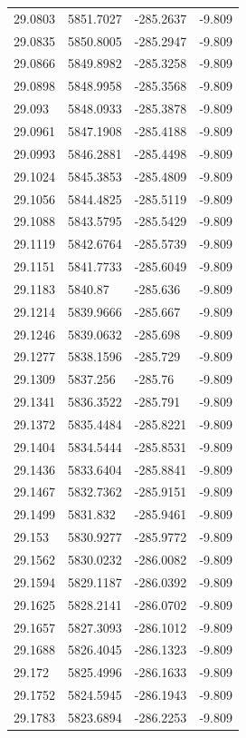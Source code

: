 \begin{table}[H]
\begin{tabular}{llll}
29.0803 & 5851.7027 & -285.2637 & -9.809 \\
29.0835 & 5850.8005 & -285.2947 & -9.809 \\
29.0866 & 5849.8982 & -285.3258 & -9.809 \\
29.0898 & 5848.9958 & -285.3568 & -9.809 \\
29.093 & 5848.0933 & -285.3878 & -9.809 \\
29.0961 & 5847.1908 & -285.4188 & -9.809 \\
29.0993 & 5846.2881 & -285.4498 & -9.809 \\
29.1024 & 5845.3853 & -285.4809 & -9.809 \\
29.1056 & 5844.4825 & -285.5119 & -9.809 \\
29.1088 & 5843.5795 & -285.5429 & -9.809 \\
29.1119 & 5842.6764 & -285.5739 & -9.809 \\
29.1151 & 5841.7733 & -285.6049 & -9.809 \\
29.1183 & 5840.87 & -285.636 & -9.809 \\
29.1214 & 5839.9666 & -285.667 & -9.809 \\
29.1246 & 5839.0632 & -285.698 & -9.809 \\
29.1277 & 5838.1596 & -285.729 & -9.809 \\
29.1309 & 5837.256 & -285.76 & -9.809 \\
29.1341 & 5836.3522 & -285.791 & -9.809 \\
29.1372 & 5835.4484 & -285.8221 & -9.809 \\
29.1404 & 5834.5444 & -285.8531 & -9.809 \\
29.1436 & 5833.6404 & -285.8841 & -9.809 \\
29.1467 & 5832.7362 & -285.9151 & -9.809 \\
29.1499 & 5831.832 & -285.9461 & -9.809 \\
29.153 & 5830.9277 & -285.9772 & -9.809 \\
29.1562 & 5830.0232 & -286.0082 & -9.809 \\
29.1594 & 5829.1187 & -286.0392 & -9.809 \\
29.1625 & 5828.2141 & -286.0702 & -9.809 \\
29.1657 & 5827.3093 & -286.1012 & -9.809 \\
29.1688 & 5826.4045 & -286.1323 & -9.809 \\
29.172 & 5825.4996 & -286.1633 & -9.809 \\
29.1752 & 5824.5945 & -286.1943 & -9.809 \\
29.1783 & 5823.6894 & -286.2253 & -9.809 \\

\end{tabular}
\end{table}
